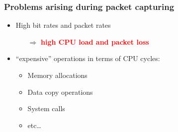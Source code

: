 \begin{frame}
\frametitle{Problems arising during packet capturing}
\begin{itemize}
	\item High bit rates and packet rates
		\begin{itemize}
			\item [$\Rightarrow$] \textbf{\textcolor{red}{high CPU load and packet loss}}
		\end{itemize}
\end{itemize}

	\begin{itemize}
	\item ``expensive'' operations in terms of CPU cycles: 
		\begin{itemize}
			\item<2-> Memory allocations
			\item<2-> Data copy operations
			\item<2-> System calls
			\item<2-> etc\ldots\newline
		\end{itemize}
	\end{itemize}

\end{frame}

 {}
